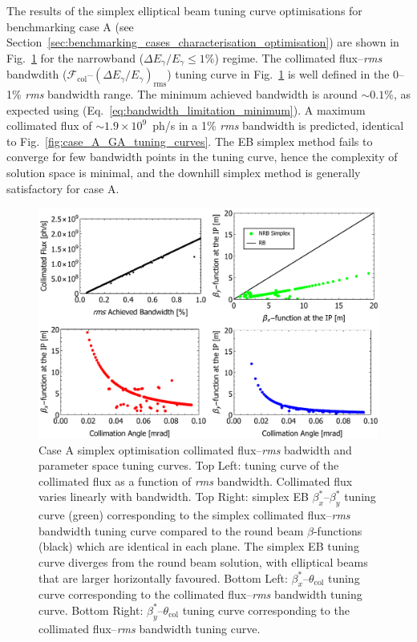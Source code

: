 \documentclass[../main.tex]{subfiles}
\begin{document}
The results of the simplex elliptical beam tuning curve optimisations for benchmarking case A (see Section~\ref{sec:benchmarking_cases_characterisation_optimisation}) are shown in Fig.~\ref{fig:case_A_simplex_tuning_curves} for the narrowband ($\Delta E_{\gamma}/E_{\gamma} \leq1$\%) regime. The collimated flux--\textit{rms} bandwdith ($\mathcal{F}_{\mathrm{col}}$--$\left(\Delta E_{\gamma}/E_{\gamma}\right)_{\mathrm{rms}}$) tuning curve in Fig.~\ref{fig:case_A_simplex_tuning_curves} is well defined in the 0--1\% \textit{rms} bandwidth range. The minimum achieved bandwidth is around $\sim0.1$\%, as expected using (Eq.~\ref{eq:bandwidth_limitation_minimum}). A maximum collimated flux of $\sim 1.9\times 10^{9}$~ph/\si{\second} in a 1\% \textit{rms} bandwidth is predicted, identical to Fig.~\ref{fig:case_A_GA_tuning_curves}. The EB simplex method fails to converge for few bandwidth points in the tuning curve, hence the complexity of solution space is minimal, and the downhill simplex method is generally satisfactory for case A. 
\begin{figure}[!h]
\centering
\includegraphics[width=\textwidth]{Figures/Optimisation_and_Characterisation_of_Inverse_Compton_Scattering_Sources/Case_A_simplex_Tuning_Curves.pdf}
\caption{Case A simplex optimisation collimated flux--\textit{rms} badwidth and parameter space tuning curves. Top Left: tuning curve of the collimated flux as a function of \textit{rms} bandwidth. Collimated flux varies linearly with bandwidth. Top Right: simplex EB $\beta_{x}^{*}$--$\beta_{y}^{*}$ tuning curve (green) corresponding to the simplex collimated flux--\textit{rms} bandwidth tuning curve compared to the round beam $\beta$-functions (black) which are identical in each plane. The simplex EB tuning curve diverges from the round beam solution, with elliptical beams that are larger horizontally favoured. Bottom Left: $\beta_{x}^{*}$--$\theta_{\mathrm{col}}$ tuning curve corresponding to the collimated flux--\textit{rms} bandwidth tuning curve. Bottom Right: $\beta_{y}^{*}$--$\theta_{\mathrm{col}}$ tuning curve corresponding to the collimated flux--\textit{rms} bandwidth tuning curve.}
\label{fig:case_A_simplex_tuning_curves}
\end{figure}
\end{document}
